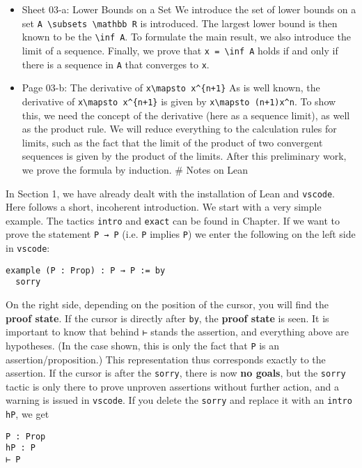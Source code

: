 \documentclass{memoir}
\begin{document}
\begin{itemize}
\item Sheet 03-a: Lower Bounds on a Set
   We introduce the set of lower bounds on a set \Verb|A \subsets \mathbb R| is introduced. The largest lower bound is then known to be the \Verb|\inf A|. To formulate the main result, we also introduce the limit of a sequence. Finally, we prove that \Verb|x = \inf A| holds if and only if there is a sequence in \Verb|A| that converges to \Verb|x|.\item Page 03-b: The derivative of \Verb|x\mapsto x^{n+1}|
    As is well known, the derivative of \Verb|x\mapsto x^{n+1}| is given by     \Verb|x\mapsto (n+1)x^n|. To show this, we need the concept of the derivative (here as a sequence limit), as well as the product rule. We will reduce everything to the calculation rules for limits, such as the fact that the limit of the product of two convergent sequences is given by the product of the limits. After this preliminary work, we prove the formula by induction.
# Notes on Lean
\end{itemize}


In Section 1, we have already dealt with the installation of Lean and \Verb|vscode|. Here follows a short, incoherent introduction. We start with a very simple example. The tactics \Verb|intro| and \Verb|exact| can be found in
Chapter. If we want to prove the statement \Verb|P → P| (i.e. \Verb|P| implies \Verb|P|) we enter the following on the left side in \Verb|vscode|:

\begin{verbatim}
example (P : Prop) : P → P := by
  sorry

\end{verbatim}


On the right side, depending on the position of the cursor, you will find the \textbf{proof state}. If the cursor is directly after \Verb|by|, the \textbf{proof state} is seen. It is important to know that behind \Verb|⊢| stands the assertion, and everything above are hypotheses. (In the case shown, this is only the fact that \Verb|P| is an assertion/proposition.) This representation thus corresponds exactly to the assertion. If the cursor is after the \Verb|sorry|, there is now \textbf{no goals}, but the \Verb|sorry| tactic is only there to prove unproven assertions without further action, and a warning is issued in \Verb|vscode|. If you delete the \Verb|sorry| and replace it with an \Verb|intro hP|, we get

\begin{verbatim}
P : Prop
hP : P
⊢ P

\end{verbatim}
\end{document}

